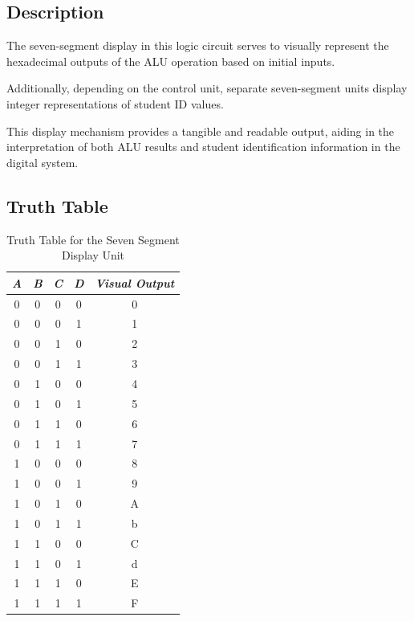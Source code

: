 
\subsection{{Description}}

	{The seven-segment display in this logic circuit serves to visually represent the hexadecimal outputs of the ALU operation based on initial inputs.}
	
	{Additionally, depending on the control unit, separate seven-segment units display integer representations of student ID values.}
	
	{This display mechanism provides a tangible and readable output, aiding in the interpretation of both ALU results and student identification information in the digital system.}

\subsection{{Truth Table}}

	\begin{table}[H]
		\centering
		\begin{tabular}{|c|c|c|c|c|}
		\hline
		\hline
			\textit{A} & \textit{B} & \textit{C} & \textit{D} & \textit{Visual Output} \\ 
			\hline
			\hline
			0 & 0 & 0 & 0 & 0 \\ 
			\hline
			0 & 0 & 0 & 1 & 1 \\ 
			\hline
			0 & 0 & 1 & 0 & 2 \\ 
			\hline
			0 & 0 & 1 & 1 & 3 \\ 
			\hline
			0 & 1 & 0 & 0 & 4 \\ 
			\hline
			0 & 1 & 0 & 1 & 5 \\ 
			\hline
			0 & 1 & 1 & 0 & 6 \\ 
			\hline
			0 & 1 & 1 & 1 & 7 \\ 
			\hline
			1 & 0 & 0 & 0 & 8 \\ 
			\hline
			1 & 0 & 0 & 1 & 9 \\ 
			\hline
			1 & 0 & 1 & 0 & A \\ 
			\hline
			1 & 0 & 1 & 1 & b \\ 
			\hline
			1 & 1 & 0 & 0 & C \\ 
			\hline
			1 & 1 & 0 & 1 & d \\ 
			\hline
			1 & 1 & 1 & 0 & E \\ 
			\hline
			1 & 1 & 1 & 1 & F \\ 
		\hline
		\hline
		\end{tabular}
		\caption{Truth Table for the Seven Segment Display Unit}
	\end{table}

